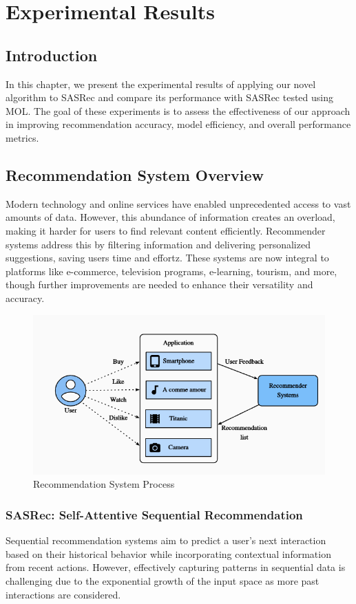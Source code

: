 \chapter{Experimental Results}
\pagestyle{fancy}
\pagestyle{fancy}\chead{} \pagestyle{fancy}\rhead{}
\pagestyle{fancy} 
\pagestyle{fancy}\cfoot{} \pagestyle{fancy}\rfoot{\thepage}
\section{Introduction}\label{start6}
In this chapter, we present the experimental results of applying our novel algorithm to SASRec and compare its performance with SASRec tested using MOL. The goal of these experiments is to assess the effectiveness of our approach in improving recommendation accuracy, model efficiency, and overall performance metrics.

\section{Recommendation System Overview}
Modern technology and online services have enabled unprecedented access to vast amounts of data. However, this abundance of information creates an overload, making it harder for users to find relevant content efficiently. Recommender systems address this by filtering information and delivering personalized suggestions, saving users time and effortz\cite{Roy2022}. These systems are now integral to platforms like e-commerce, television programs\cite{5174476}, e-learning\cite{WANG201110831}, tourism, and more, though further improvements are needed to enhance their versatility and accuracy.
\begin{figure}[ht]
	\centering
	\includegraphics[width=0.5\linewidth]{Figures/RS.png}
	\caption{Recommendation System Process\cite{zhang2021recsys}}
	\label{Recommendation_System _Process}	
\end{figure}
\subsection{SASRec: Self-Attentive Sequential Recommendation}
Sequential recommendation systems aim to predict a user’s next interaction based on their historical behavior while incorporating contextual information from recent actions. However, effectively capturing patterns in sequential data is challenging due to the exponential growth of the input space as more past interactions are considered.\cite{kang2018selfat}
